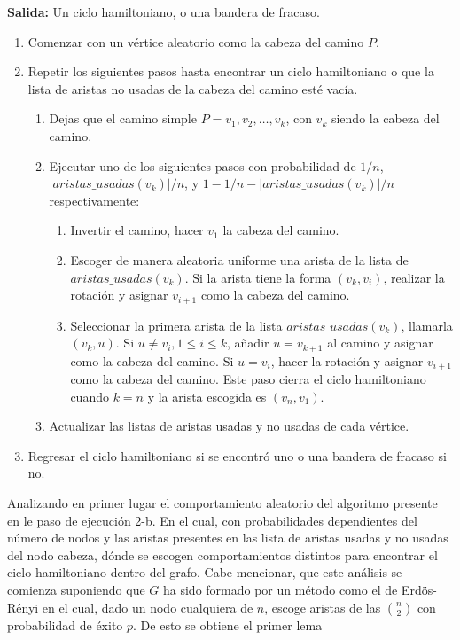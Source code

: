 \documentclass[12pt,letterpaper]{article}
\begin{document}
   \textbf{Salida:} Un ciclo hamiltoniano, o una bandera de fracaso.
   \begin{enumerate}
   	\item Comenzar con un vértice aleatorio como la cabeza del camino $P$.
   	\item Repetir los siguientes pasos hasta encontrar un ciclo hamiltoniano o que la lista de aristas no usadas de la cabeza del camino esté vacía.\begin{enumerate}
   		\item Dejas que el camino simple $P=v_1, v_2, \dots,v_k$, con $v_k$ siendo la cabeza del camino.
   		\item Ejecutar uno de los siguientes pasos con probabilidad de $1/n$, $|aristas\_usadas(v_k)|/n$, y $1-1/n-|aristas\_usadas(v_k)|/n$ respectivamente:\begin{enumerate}
   			\item Invertir el camino, hacer $v_1$ la cabeza del camino.
   			\item Escoger de manera aleatoria uniforme una arista de la lista de $aristas\_usadas(v_k)$. Si la arista tiene la forma $(v_k, v_i)$, realizar la rotación y asignar $v_{i+1}$ como la cabeza del camino. 
   			\item  Seleccionar la primera arista de la lista $aristas\_usadas(v_k)$, llamarla $(v_k, u)$. Si $u \neq v_i, 1 \leq i \leq k$, añadir $u=v_{k+1}$ al camino y asignar como la cabeza del camino. Si $u = v_i$, hacer la rotación y asignar $v_{i+1}$ como la cabeza del camino. Este paso cierra el ciclo hamiltoniano cuando $k=n$ y la arista escogida es $(v_n, v_1)$.
   		\end{enumerate}
   		\item Actualizar las listas de aristas usadas y no usadas de cada vértice. 
   	\end{enumerate} 
   	\item Regresar el ciclo hamiltoniano si se encontró uno o una bandera de fracaso si no.
   \end{enumerate}
   Analizando en primer lugar el comportamiento aleatorio del algoritmo presente en le paso de ejecución 2-b. En el cual, con probabilidades dependientes del número de nodos y las aristas presentes en las lista de aristas usadas y no usadas del nodo cabeza, dónde se escogen comportamientos distintos para encontrar el ciclo hamiltoniano dentro del grafo. Cabe mencionar, que este análisis se comienza suponiendo que $G$ ha sido formado por un método como el de Erdös-Rényi en el cual, dado un nodo cualquiera de $n$, escoge aristas de las ${n\choose 2}$ con probabilidad de éxito $p$. De esto se obtiene el primer lema
\end{document}
